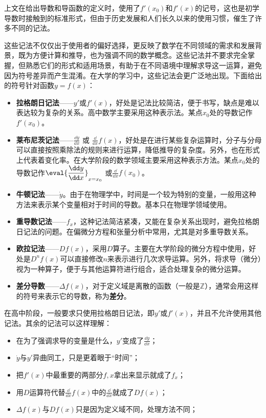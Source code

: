 上文在给出导数和导函数的定义时，使用了$f'(x_0)$和$f'(x)$的记号，这也是初学导数时接触到的标准形式，但由于历史发展和人们长久以来的使用习惯，催生了许多不同的记法。

这些记法不仅仅出于使用者的偏好选择，更反映了数学在不同领域的需求和发展背景，既为方便计算和推导，也为强调不同的数学概念。这些记法并不要求完全掌握，但熟悉它们的形式和适用场景，有助于在不同语境中理解求导这一运算，避免因为符号差异而产生混淆。在大学的学习中，这些记法会更广泛地出现。下面给出的符号针对函数$y=f(x)$：

\begin{itemize}
\item \textbf{拉格朗日记法}——$y'$或$f'(x)$，好处是记法比较简洁，便于书写，缺点是难以表达较为复杂的关系。高中数学主要采用这种表示法。某点$x_0$处的导数记作$f'(x_0)$。
\item \textbf{莱布尼茨记法}——$\displaystyle\frac{\dd y}{\dd x}$  或  $\displaystyle\frac{\dd}{\dd x}f(x)$，好处是在进行某些复杂运算时，分子与分母可以直接按照乘除法的规则来进行运算，降低推导的复杂度。另外，也在形式上代表着变化率。在大学阶段的数学领域主要采用这种表示方法。某点$x_0$处的导数记作$\displaystyle\eval{\frac{\dd y}{\dd x}}_{x=x_0}$ 或$\displaystyle\frac{\dd}{\dd x}f(x_0)$。
\item \textbf{牛顿记法}——$\dot{y}$。由于在物理学中，时间是一个较为特别的变量，一般用这种方法来表示某个变量相对于时间的导数。基本只在物理学领域使用。
\item \textbf{重导数记法}——$f_x$，这种记法简洁紧凑，又能在复杂关系出现时，避免拉格朗日记法的问题。在偏微分方程和张量分析中常用，尤其是对多重导数关系。
\item \textbf{欧拉记法}——$Df(x)$，采用$D$算子。主要在大学阶段的微分方程中使用，好处是$D^n f(x)$可以直接修改$n$来表示进行几次求导运算。另外，将求导（微分）视为一种算子，便于与其他运算符进行组合，适合处理复杂的微分运算。
\item \textbf{差分导数}——$\Delta f(x)$，对于定义域是离散的函数（一般是$\mathbb{Z}$），通常会用这样的符号来表示它的导数，称为\textbf{差分}。
\end{itemize}

在高中阶段，一般要求只使用拉格朗日记法，即$y'$或$f'(x)$，并且不允许使用其他记法。其余的记法可以这样理解：

\begin{itemize}
\item 在为了强调求导的变量是什么，$y'$变成了$\displaystyle\frac{\dd y}{\dd x}$；
\item $\dot{y}$与$y'$异曲同工，只是更着眼于“时间”；
\item 把$f'(x)$中最重要的两部分$f,x$拿出来显示就成了$f_x$；
\item 用$D$运算符代替$\displaystyle\frac{\dd}{\dd x}f(x)$中的$\displaystyle\frac{\dd}{\dd x}$就成了$Df(x)$；
\item $\Delta f(x)$与$Df(x)$只是因为定义域不同，处理方法不同；
\end{itemize}

